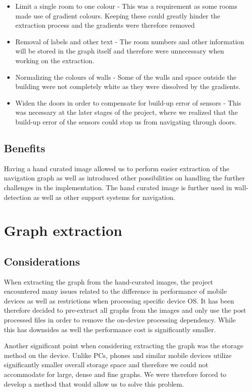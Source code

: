 \documentclass[main.tex]{subfiles}
\begin{document}
		\begin{itemize}
			\item Limit a single room to one colour - This was a requirement as some rooms made use of gradient colours. Keeping these could greatly hinder the extraction process and the gradients were therefore removed
			\item Removal of labels and other text - The room numbers and other information will be stored in the graph itself and therefore were unnecessary when working on the extraction.
			\item Normalizing the colours of walls - Some of the walls and space outside the building were not completely white as they were dissolved by the gradients.
			\item Widen the doors in order to compensate for build-up error of sensors - This was necessary at the later stages of the project, where we realized that the build-up error of the sensors could stop us from navigating through doors.
		\end{itemize}
		
		\subsection{Benefits}
		Having a hand curated image allowed us to perform easier extraction of the navigation graph as well as introduced other possibilities on handling the further challenges in the implementation. The hand curated image is further used in wall-detection as well as other support systems for navigation. 
		
		\section{Graph extraction}
		\subsection{Considerations}
		When extracting the graph from the hand-curated images, the project encountered many issues related to the difference in performance of mobile devices as well as restrictions when processing specific device OS. It has been therefore decided to pre-extract all graphs from the images and only use the  post processed files in order to remove the on-device processing dependency. While this has downsides as well the performance cost is significantly smaller.
		\newline
		
	Another significant point when considering extracting the graph was the storage method on the device. Unlike PCs, phones and similar mobile devices utilize significantly smaller overall storage space and therefore we could not accommodate for large, dense and fine graphs. We were therefore forced to develop a method that would allow us to solve this problem. 
	\newline
	
\end{document}
